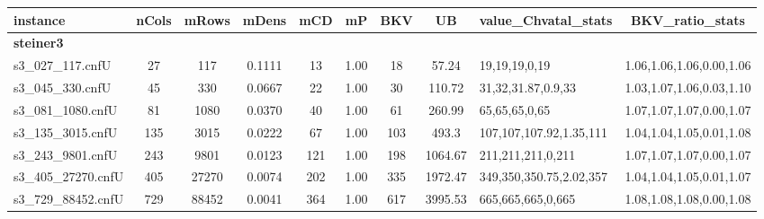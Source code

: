 \begin{table*}[t!]
  \small{
  \hspace*{-0em}
  \begin{tabular}{l@{\hspace{1\tabcolsep}}c@{\hspace{1\tabcolsep}}c@{\hspace{1\tabcolsep}}c@{\hspace{1\tabcolsep}}c@{\hspace{1\tabcolsep}}c@{\hspace{1\tabcolsep}}c@{\hspace{1\tabcolsep}}c@{\hspace{1\tabcolsep}}l@{\hspace{1\tabcolsep}}c} %
    \toprule
    instance & nCols & mRows & mDens & mCD & mP & BKV & UB & value\_Chvatal\_stats  & BKV\_ratio\_stats\\
    \midrule
    {\bf steiner3} &  &  &  &  & &  & & &\\ 
 s3\_027\_117.cnfU & 27 & 117 & 0.1111 & 13 & 1.00 & 18 & 57.24 & 19,19,19,0,19 & 1.06,1.06,1.06,0.00,1.06 \\ 
 s3\_045\_330.cnfU & 45 & 330 & 0.0667 & 22 & 1.00 & 30 & 110.72 & 31,32,31.87,0.9,33 & 1.03,1.07,1.06,0.03,1.10 \\ 
 s3\_081\_1080.cnfU & 81 & 1080 & 0.0370 &  40 & 1.00 & 61 & 260.99 & 65,65,65,0,65 & 1.07,1.07,1.07,0.00,1.07 \\ 
 s3\_135\_3015.cnfU & 135 & 3015 & 0.0222 &  67 & 1.00 & 103 & 493.3 & 107,107,107.92,1.35,111 & 1.04,1.04,1.05,0.01,1.08 \\ 
 s3\_243\_9801.cnfU & 243 & 9801 & 0.0123 &  121 & 1.00 & 198 & 1064.67 & 211,211,211,0,211 & 1.07,1.07,1.07,0.00,1.07 \\ 
 s3\_405\_27270.cnfU & 405 & 27270 & 0.0074 & 202 & 1.00 & 335 & 1972.47 & 349,350,350.75,2.02,357 & 1.04,1.04,1.05,0.01,1.07 \\ 
 s3\_729\_88452.cnfU & 729 & 88452 & 0.0041 & 364 & 1.00 & 617 & 3995.53 & 665,665,665,0,665 & 1.08,1.08,1.08,0.00,1.08 \\ 

\midrule


\end{tabular}}
\end{table*}
